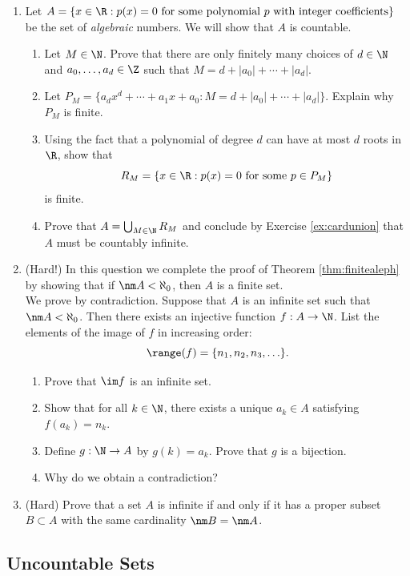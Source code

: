 \begin{enumerate}
	\item \label{ex:algcard} Let $A = \{x \in \R : p(x) = 0 \text{ for some polynomial $p$ with integer coefficients}\}$ be the set of \emph{algebraic} numbers. We will show that $A$ is countable.
\begin{enumerate}
    \item Let $M \in \N$. Prove that there are only finitely many choices of $d \in \N$ and $a_0,\ldots,a_d \in \Z$ such that $M = d + |a_0| + \cdots + |a_d|$.
    \item Let $P_M = \{a_d x^d + \cdots + a_1 x + a_0 : M = d + |a_0| + \cdots + |a_d|\}$. Explain why $P_M$ is finite.
    \item Using the fact that a polynomial of degree $d$ can have at most $d$ roots in $\R$, show that
    \[
        R_M = \{x \in \R : p(x) = 0 \text{ for some } p \in P_M\}
    \]
    is finite.
    \item Prove that $A = \bigcup_{M \in \N} R_M$ and conclude by Exercise \ref{ex:cardunion} that $A$ must be countably infinite.
\end{enumerate}
	
	\item(Hard!) In this question we complete the proof of Theorem \ref{thm:finitealeph} by showing that if $\nm A<\aleph_0$, then $A$ is a finite set.\\[2pt]
	We prove by contradiction. Suppose that $A$ is an infinite set such that $\nm A<\aleph_0$. Then there exists an injective function $f:A\to\N$. List the elements of the image of $f$ in increasing order:
	  \[\range(f)=\{n_1,n_2,n_3,\ldots\}.\]
	\begin{enumerate}
	  \item Prove that $\im f$ is an infinite set.
	  \item Show that for all $k\in\N$, there exists a unique $a_k\in A$ satisfying $f(a_k)=n_k$.
	  \item Define $g:\N\to A$ by $g(k)=a_k$. Prove that $g$ is a bijection.
	  \item Why do we obtain a contradiction?
	\end{enumerate}
	
	\item\label{ex:cardinf} (Hard) Prove that a set $A$ is infinite if and only if it has a proper subset $B\subset A$ with the same cardinality $\nm B=\nm A$.
\end{enumerate}
\newpage

\subsection{Uncountable Sets}


